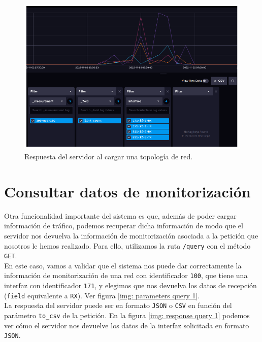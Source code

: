 \documentclass[a4paper, oneside, 12pt]{book}
\begin{document}
	\begin{figure}[h!]
		\begin{center}
			\includegraphics[width=1\textwidth]{diag/influxdb_topology_1.png}
			\caption{Respuesta del servidor al cargar una topología de red.}
			\label{img: influxdb topology 1}
		\end{center}
	\end{figure}
	
	\section{Consultar datos de monitorización}
	
	\noindent Otra funcionalidad importante del sistema es que, además de poder cargar información de tráfico, podemos recuperar dicha información de modo que el servidor nos devuelva la información de monitorización asociada a la petición que nosotros le hemos realizado. Para ello, utilizamos la ruta \texttt{/query} con el método \texttt{GET}. \\
	
	\noindent En este caso, vamos a validar que el sistema nos puede dar correctamente la información de monitorización de una red con identificador \texttt{100}, que tiene una interfaz con identificador \texttt{171}, y elegimos que nos devuelva los datos de recepción (\texttt{field} equivalente a \texttt{RX}). Ver figura \ref{img: parameters query 1}. \\
	
	\noindent La respuesta del servidor puede ser en formato \texttt{JSON} o \texttt{CSV} en función del parámetro \texttt{to\_csv} de la petición. En la figura \ref{img: response query 1} podemos ver cómo el servidor nos devuelve los datos de la interfaz solicitada en formato \texttt{JSON}.
	
\end{document}
